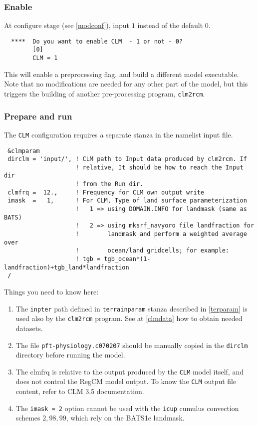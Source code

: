 \subsubsection{Enable}

At configure stage (see \ref{modconf}), input $1$ instead of the default $0$.

\begin{Verbatim}
  ****  Do you want to enable CLM  - 1 or not - 0?
        [0]
        CLM = 1
\end{Verbatim}

This will enable a preprocessing flag, and build a different model executable.
Note that no modifications are needed for any other part of the model, but
this triggers the building of another pre-processing program, \verb=clm2rcm=.

\subsubsection{Prepare and run}
\label{clmrun}

The \verb=CLM= configuration requires a separate stanza in the namelist input
file.

{\footnotesize
\begin{Verbatim}
 &clmparam
 dirclm = 'input/', ! CLM path to Input data produced by clm2rcm. If 
                    ! relative, It should be how to reach the Input dir
                    ! from the Run dir.
 clmfrq =  12.,     ! Frequency for CLM own output write
 imask  =   1,      ! For CLM, Type of land surface parameterization
                    !   1 => using DOMAIN.INFO for landmask (same as BATS)
                    !   2 => using mksrf_navyoro file landfraction for
                    !        landmask and perform a weighted average over
                    !        ocean/land gridcells; for example:
                    ! tgb = tgb_ocean*(1-landfraction)+tgb_land*landfraction
 /
\end{Verbatim}
}

Things you need to know here:

\begin{enumerate}
\item The \verb=inpter= path defined in \verb=terrainparam= stanza described in
\ref{terparam} is used also by the \verb=clm2rcm= program. See at \ref{clmdata}
how to obtain needed datasets.
\item The file \verb=pft-physiology.c070207= should be manually copied in the
\verb=dirclm= directory before running the model.
\item The clmfrq is relative to the output produced by the \verb=CLM= model
itself, and does not control the RegCM model output. To know the \verb=CLM=
output file content, refer to CLM 3.5 documentation.
\item The \verb'imask = 2' option cannot be used with the \verb'icup'
cumulus convection schemes $2, 98, 99$, which rely on the BATS1e landmask.
\end{enumerate}


